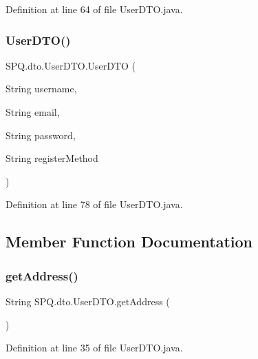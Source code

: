 Definition at line 64 of file User\+D\+T\+O.\+java.

\mbox{\label{class_s_p_q_1_1dto_1_1_user_d_t_o_a96eac4c18d86e06c5fd796e69322e5fb}} 
\subsubsection{\texorpdfstring{User\+D\+T\+O()}{UserDTO()}\hspace{0.1cm}{\footnotesize\ttfamily [11/11]}}
{\footnotesize\ttfamily S\+P\+Q.\+dto.\+User\+D\+T\+O.\+User\+D\+TO (\begin{DoxyParamCaption}\item[{String}]{username,  }\item[{String}]{email,  }\item[{String}]{password,  }\item[{String}]{register\+Method }\end{DoxyParamCaption})}



Definition at line 78 of file User\+D\+T\+O.\+java.



\subsection{Member Function Documentation}
\mbox{\label{class_s_p_q_1_1dto_1_1_user_d_t_o_a5234f9e12bcda79c32c4aec80de40ad2}} 
\subsubsection{\texorpdfstring{get\+Address()}{getAddress()}}
{\footnotesize\ttfamily String S\+P\+Q.\+dto.\+User\+D\+T\+O.\+get\+Address (\begin{DoxyParamCaption}{ }\end{DoxyParamCaption})}



Definition at line 35 of file User\+D\+T\+O.\+java.

